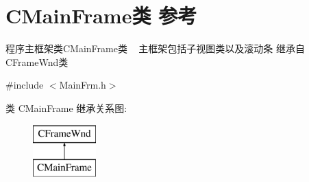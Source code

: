 \hypertarget{class_c_main_frame}{}\section{C\+Main\+Frame类 参考}
\label{class_c_main_frame}


程序主框架类\+C\+Main\+Frame类 ~\newline
主框架包括子视图类以及滚动条 继承自\+C\+Frame\+Wnd类  




{\ttfamily \#include $<$Main\+Frm.\+h$>$}

类 C\+Main\+Frame 继承关系图\+:\begin{figure}[H]
\begin{center}
\leavevmode
\includegraphics[height=2.000000cm]{class_c_main_frame}
\end{center}
\end{figure}
